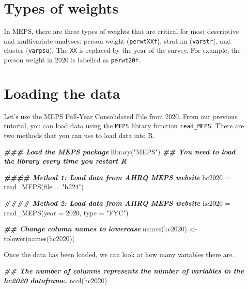 \documentclass[
]{book}
\newenvironment{Shaded}{\begin{snugshade}}{\end{snugshade}}
\newcommand{\AttributeTok}[1]{\textcolor[rgb]{0.77,0.63,0.00}{#1}}
\newcommand{\DecValTok}[1]{\textcolor[rgb]{0.00,0.00,0.81}{#1}}
\newcommand{\DocumentationTok}[1]{\textcolor[rgb]{0.56,0.35,0.01}{\textbf{\textit{#1}}}}
\newcommand{\FunctionTok}[1]{\textcolor[rgb]{0.00,0.00,0.00}{#1}}
\newcommand{\NormalTok}[1]{#1}
\newcommand{\OtherTok}[1]{\textcolor[rgb]{0.56,0.35,0.01}{#1}}
\newcommand{\StringTok}[1]{\textcolor[rgb]{0.31,0.60,0.02}{#1}}
\begin{document}
\hypertarget{types-of-weights}{%
\section{Types of weights}\label{types-of-weights}}

In MEPS, there are three types of weights that are critical for most descriptive and multivariate analyses: person weight (\texttt{perwtXXf}), stratum (\texttt{varstr}), and cluster (\texttt{varpsu}). The \texttt{XX} is replaced by the year of the survey. For example, the person weight in 2020 is labelled as \texttt{perwt20f}.

\hypertarget{loading-the-data}{%
\section{Loading the data}\label{loading-the-data}}

Let's use the MEPS Full-Year Consolidated File from 2020. From our previous tutorial, you can load data using the \texttt{MEPS} library function \texttt{read\_MEPS}. There are two methods that you can use to load data into R.

\begin{Shaded}
\begin{Highlighting}[]
\DocumentationTok{\#\#\# Load the MEPS package}
\FunctionTok{library}\NormalTok{(}\StringTok{"MEPS"}\NormalTok{) }\DocumentationTok{\#\# You need to load the library every time you restart R}

\DocumentationTok{\#\#\#\# Method 1: Load data from AHRQ MEPS website}
\NormalTok{hc2020 }\OtherTok{=} \FunctionTok{read\_MEPS}\NormalTok{(}\AttributeTok{file =} \StringTok{"h224"}\NormalTok{)}

\DocumentationTok{\#\#\#\# Method 2: Load data from AHRQ MEPS website}
\NormalTok{hc2020 }\OtherTok{=} \FunctionTok{read\_MEPS}\NormalTok{(}\AttributeTok{year =} \DecValTok{2020}\NormalTok{, }\AttributeTok{type =} \StringTok{"FYC"}\NormalTok{)}

\DocumentationTok{\#\# Change column names to lowercase}
\FunctionTok{names}\NormalTok{(hc2020) }\OtherTok{\textless{}{-}} \FunctionTok{tolower}\NormalTok{(}\FunctionTok{names}\NormalTok{(hc2020))}
\end{Highlighting}
\end{Shaded}

Once the data has been loaded, we can look at how many variables there are.

\begin{Shaded}
\begin{Highlighting}[]
\DocumentationTok{\#\# The number of columns represents the number of variables in the hc2020 dataframe. }
\FunctionTok{ncol}\NormalTok{(hc2020)}
\end{Highlighting}
\end{Shaded}
\end{document}
